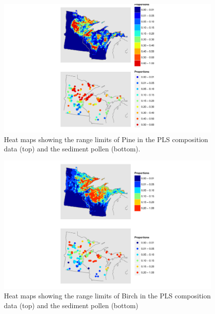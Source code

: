 \begin{figure}
\centering
\includegraphics[width=7in]{figures/maps_compare_PINE.pdf}
\caption{Heat maps showing the range limits of Pine in the PLS composition data (top) and the sediment pollen (bottom).}
\label{fig:compare_maps_PINE}
\end{figure}

\begin{figure}
\centering
\includegraphics[width=7in]{figures/maps_compare_BIRCH.pdf}
\caption{Heat maps showing the range limits of Birch in the PLS composition data (top) and the sediment pollen (bottom)}
\label{fig:compare_maps_PINE}
\end{figure}

